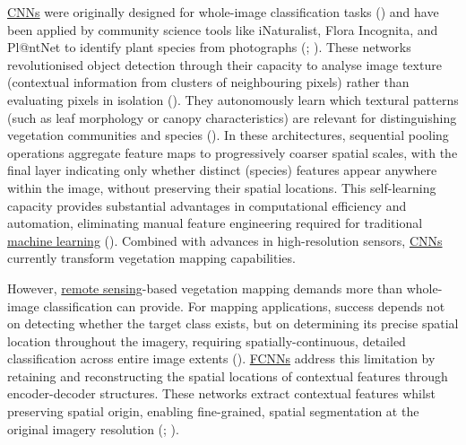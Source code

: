 \documentclass[
]{scrreprt}
\begin{document}
\hyperref[acronyms_CNN]{CNNs} were originally designed for whole-image
classification tasks
() and have been applied by community science tools like
iNaturalist, Flora Incognita, and Pl@ntNet to identify plant species
from photographs (; ). These networks revolutionised object detection through their
capacity to analyse image texture (contextual information from clusters
of neighbouring pixels) rather than evaluating pixels in isolation
(). They
autonomously learn which textural patterns (such as leaf morphology or
canopy characteristics) are relevant for distinguishing vegetation
communities and species (). In these architectures, sequential pooling operations
aggregate feature maps to progressively coarser spatial scales, with the
final layer indicating only whether distinct (species) features appear
anywhere within the image, without preserving their spatial locations.
This self-learning capacity provides substantial advantages in
computational efficiency and automation, eliminating manual feature
engineering required for traditional \hyperref[acronyms_ML]{machine
learning} (). Combined with advances in high-resolution sensors,
\hyperref[acronyms_CNN]{CNNs} currently transform vegetation mapping
capabilities.

However, \hyperref[acronyms_RS]{remote sensing}-based vegetation mapping
demands more than whole-image classification can provide. For mapping
applications, success depends not on detecting whether the target class
exists, but on determining its precise spatial location throughout the
imagery, requiring spatially-continuous, detailed classification across
entire image extents
(). \hyperref[acronyms_FCNN]{FCNNs} address this limitation by
retaining and reconstructing the spatial locations of contextual
features through encoder-decoder structures. These networks extract
contextual features whilst preserving spatial origin, enabling
fine-grained, spatial segmentation at the original imagery resolution
(;
).
\end{document}

